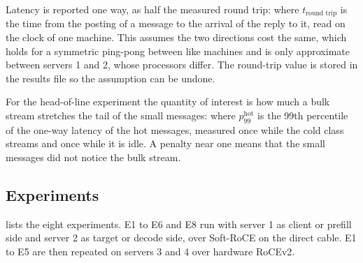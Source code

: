 Latency is reported one way, as half the measured round trip:
where $t_{\text{round trip}}$ is the time from the posting of a message to
the arrival of the reply to it, read on the clock of one machine.
This assumes the two directions cost the same, which holds for a symmetric
ping-pong between like machines and is only approximate between servers 1 and
2, whose processors differ. The round-trip value is stored in the results file
so the assumption can be undone.

For the head-of-line experiment the quantity of interest is how much a bulk
stream stretches the tail of the small messages:
where $p_{99}^{\text{hot}}$ is the 99th percentile of the one-way latency of
the hot messages, measured once while the cold class streams and once while
it is idle. A penalty near one means that the small messages did not notice
the bulk stream.

\subsection{Experiments}
\label{sec:experiments}

 lists the eight experiments. E1 to E6 and E8 run with
server 1 as client or prefill side and server 2 as target or decode side, over
Soft-RoCE on the direct cable. E1 to E5 are then repeated on servers
3 and 4 over hardware RoCEv2.

